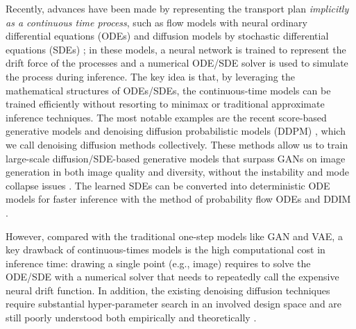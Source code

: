 Recently, advances have been made by representing 
the transport plan 
\emph{implicitly as a continuous time  process}, such as 
flow models with neural ordinary differential equations (ODEs) \citep[e.g.,][]{chen2018neural, papamakarios2021normalizing} and  diffusion models by stochastic differential equations (SDEs) \citep[e.g.,][]{song2020score, ho2020denoising, tzen2019theoretical, de2021diffusion, vargas2021solving};
in these models, 
a neural network 
is trained to represent the 
drift force of the processes
and a numerical ODE/SDE solver is used to simulate the process during inference. 
The key idea is that, 
by leveraging the mathematical structures of ODEs/SDEs, 
the continuous-time models 
can be trained efficiently without 
resorting to minimax or traditional approximate inference techniques. 
The most notable examples are 
the recent score-based generative models \cite{song2019generative, song2020improved, song2020score} 
and denoising diffusion probabilistic models (DDPM) \citep{ho2020denoising}, 
which we call denoising diffusion methods collectively. 
These methods 
allow us to train 
large-scale diffusion/SDE-based generative models that 
surpass GANs on image generation in both image quality and diversity,
without the instability and mode collapse issues
\citep[e.g.,][]{dhariwal2021diffusion, glide, dalle2, imagegen}.  
The learned SDEs can be converted into deterministic ODE models  for faster inference with the method of probability flow ODEs \citep{song2020score} and DDIM \citep{song2020denoising}. 

However, compared with the traditional one-step models like GAN and VAE, 
a key drawback of  continuous-times models %
is the 
high computational cost in inference time: drawing a single point (e.g., image) requires to solve the ODE/SDE with a numerical solver that needs to repeatedly call the expensive neural drift function. 
In addition, the existing denoising diffusion techniques 
require substantial hyper-parameter search in an involved design space 
and are still poorly understood both empirically and theoretically \citep{elucidating}. 



